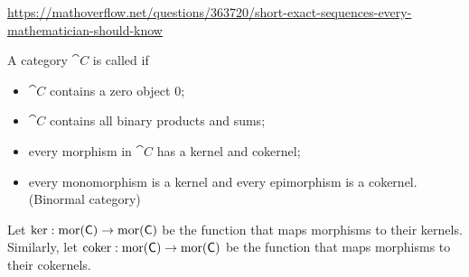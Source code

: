 \url{https://mathoverflow.net/questions/363720/short-exact-sequences-every-mathematician-should-know}

\begin{definition}
A category $\cat{C}$ is called  if
\begin{itemize}
\item $\cat{C}$ contains a zero object $0$;
\item $\cat{C}$ contains all binary products and sums;
\item every morphism in $\cat{C}$ has a kernel and cokernel;
\item every monomorphism is a kernel and every epimorphism is a cokernel. (Binormal category)
\end{itemize}
Let $\ker: \operatorname{mor}(\mathsf{C}) \to \operatorname{mor}(\mathsf{C})$ be the function that maps morphisms to their kernels. Similarly, let $\operatorname{coker}: \operatorname{mor}(\mathsf{C}) \to \operatorname{mor}(\mathsf{C})$ be the function that maps morphisms to their cokernels.
\end{definition}


